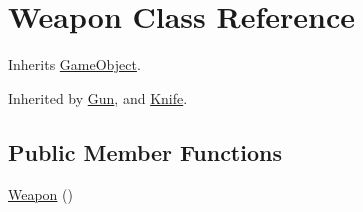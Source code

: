 \hypertarget{class_weapon}{\section{Weapon Class Reference}
\label{class_weapon}
}


Inherits \hyperlink{class_game_object}{Game\+Object}.



Inherited by \hyperlink{class_gun}{Gun}, and \hyperlink{class_knife}{Knife}.

\subsection*{Public Member Functions}
\begin{DoxyCompactItemize}
\item 
\hypertarget{class_weapon_a42dbc46dd70319a24763992c4ebbd396}{\hyperlink{class_weapon_a42dbc46dd70319a24763992c4ebbd396}{Weapon} ()}\label{class_weapon_a42dbc46dd70319a24763992c4ebbd396}


\end{DoxyCompactItemize}
